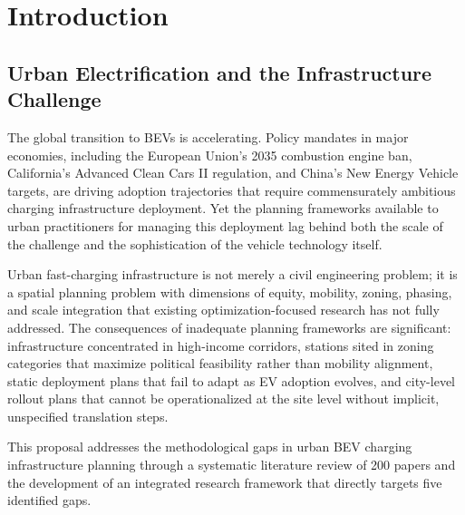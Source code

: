 \documentclass[letterpaper, 12pt, oneside, doublespacing]{Thesis}
\begin{document}
\begin{abstract}
\noindent \textbf{Keywords:} BEV; fast-charging infrastructure; urban planning; spatial optimization; equity; phased deployment; meso-micro integration; systematic literature review; PRISMA



\bigskip\noindent\rule{\linewidth}{0.4pt}\bigskip

\end{abstract}

\tableofcontents
\clearpage
\listoffigures
\clearpage
\listoftables
\clearpage

\mainmatter
\fancyhead{}
\fancyfoot[C]{\thepage}
\pagestyle{fancy}

\chapter{Introduction}

\section{Urban Electrification and the Infrastructure Challenge}

The global transition to BEVs is accelerating. Policy mandates in major economies, including the European Union's 2035 combustion engine ban, California's Advanced Clean Cars II regulation, and China's New Energy Vehicle targets, are driving adoption trajectories that require commensurately ambitious charging infrastructure deployment. Yet the planning frameworks available to urban practitioners for managing this deployment lag behind both the scale of the challenge and the sophistication of the vehicle technology itself.

Urban fast-charging infrastructure is not merely a civil engineering problem; it is a spatial planning problem with dimensions of equity, mobility, zoning, phasing, and scale integration that existing optimization-focused research has not fully addressed. The consequences of inadequate planning frameworks are significant: infrastructure concentrated in high-income corridors, stations sited in zoning categories that maximize political feasibility rather than mobility alignment, static deployment plans that fail to adapt as EV adoption evolves, and city-level rollout plans that cannot be operationalized at the site level without implicit, unspecified translation steps.

This proposal addresses the methodological gaps in urban BEV charging infrastructure planning through a systematic literature review of 200 papers and the development of an integrated research framework that directly targets five identified gaps.
\end{document}
